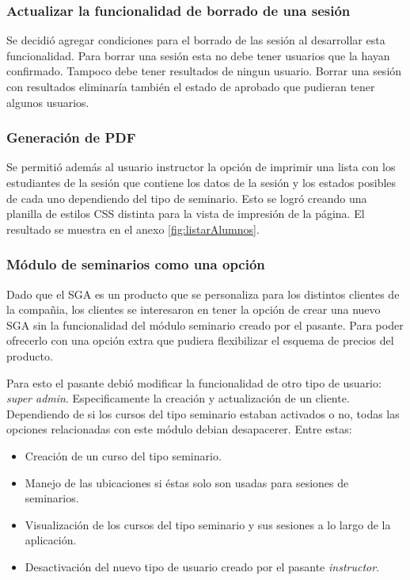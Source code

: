 \subsubsection{Actualizar la funcionalidad de borrado de una sesión}

Se decidió agregar condiciones para el borrado de las sesión al desarrollar esta funcionalidad. Para borrar una sesión esta no debe tener usuarios que la hayan confirmado. Tampoco debe tener resultados de ningun usuario. Borrar una sesión con resultados eliminaría también el estado de aprobado que pudieran tener algunos usuarios.

\subsubsection{Generación de PDF}

Se permitió además al usuario instructor la opción de imprimir una lista con los estudiantes de la sesión que contiene los datos de la sesión y los estados posibles de cada uno dependiendo del tipo de seminario. Esto se logró creando una planilla de estilos CSS distinta para la vista de impresión de la página. El resultado se muestra en el anexo \ref{fig:listarAlumnos}.


\subsubsection{Módulo de seminarios como una opción}

Dado que el SGA es un producto que se personaliza para los distintos clientes de la compañia, los clientes se interesaron en tener la opción de crear una nuevo SGA sin la funcionalidad del módulo seminario creado por el pasante. Para poder ofrecerlo con una opción extra que pudiera flexibilizar el esquema de precios del producto.

Para esto el pasante debió modificar la funcionalidad de otro tipo de usuario: \emph{super admin}. Especificamente la creación y actualización de un cliente. Dependiendo de si los cursos del tipo seminario estaban activados o no, todas las opciones relacionadas con este módulo debian desapacerer. Entre estas:

\begin{itemize}
	\item Creación de un curso del tipo seminario.
	\item Manejo de las ubicaciones si éstas solo son usadas para sesiones de seminarios.
	\item Visualización de los cursos del tipo seminario y sus sesiones a lo largo de la aplicación.
	\item Desactivación del nuevo tipo de usuario creado por el pasante \emph{instructor}.
\end{itemize}


